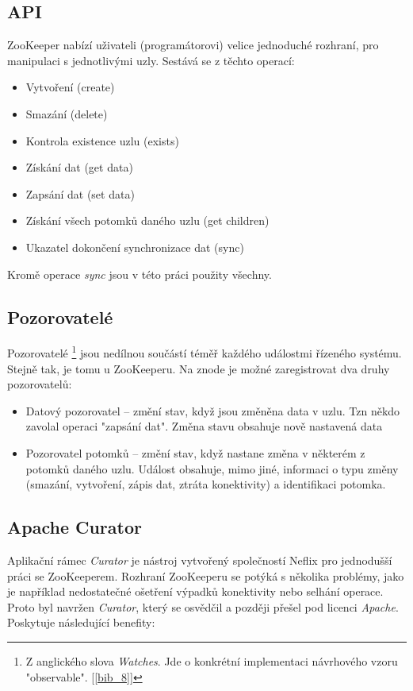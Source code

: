 \documentclass[
  digital, %
  table,   %
  nolof,     %
  nolot,     %
  oneside, %
  nocover,
  monochrome,
  12pt
]{fithesis3}
\begin{document}
\subsection*{API}
ZooKeeper nabízí uživateli (programátorovi) velice jednoduché rozhraní, pro manipulaci s jednotlivými uzly. Sestává se z těchto operací:
\begin{itemize}
  \item Vytvoření (create)
  \item Smazání (delete)
  \item Kontrola existence uzlu (exists)
  \item Získání dat (get data)
  \item Zapsání dat (set data)
  \item Získání všech potomků daného uzlu (get children)
  \item Ukazatel dokončení synchronizace dat (sync)
\end{itemize}

Kromě operace \textit{sync} jsou v této práci použity všechny.

\subsection*{Pozorovatelé}
Pozorovatelé \footnote{Z anglického slova \textit{Watches}. Jde o konkrétní implementaci návrhového vzoru "observable". [\ref{bib_8}]} jsou nedílnou součástí téměř každého událostmi řízeného systému. Stejně tak, je tomu u ZooKeeperu. Na znode je možné zaregistrovat dva druhy pozorovatelů:

\begin{itemize}
  \item Datový pozorovatel -- změní stav, když jsou změněna data v uzlu. Tzn někdo zavolal operaci "zapsání dat". Změna stavu obsahuje nově nastavená data
  \item Pozorovatel potomků -- změní stav, když nastane změna v některém z potomků daného uzlu. Událost obsahuje, mimo jiné, informaci o typu změny (smazání, vytvoření, zápis dat, ztráta konektivity) a identifikaci potomka. 
\end{itemize}

\subsection*{Apache Curator}
Aplikační rámec \textit{Curator}	je nástroj vytvořený společností Neflix pro jednodušší práci se ZooKeeperem. Rozhraní ZooKeeperu se potýká s několika problémy, jako je například nedostatečné ošetření výpadků konektivity nebo selhání operace. Proto byl navržen \textit{Curator}, který se osvědčil a později přešel pod licenci \textit{Apache}. Poskytuje následující benefity:
\end{document}
